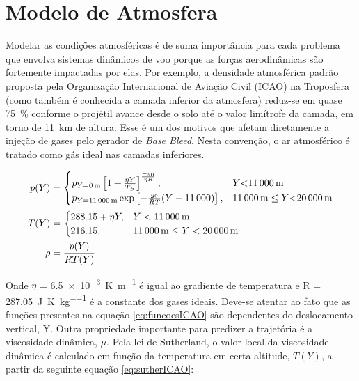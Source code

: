 \section{Modelo de Atmosfera}
\label{sec:ICAOatm}

Modelar as condições atmosféricas é de suma importância para cada problema que envolva sistemas dinâmicos de voo porque as forças aerodinâmicas são fortemente impactadas por elas. Por exemplo, a densidade atmosférica padrão proposta pela Organização Internacional de Aviação Civil (ICAO) \cite{international1993manual} na Troposfera (como também é conhecida a camada inferior da atmosfera) reduz-se em quase \qty{75}{\percent} conforme o projétil avance desde o solo até o valor limítrofe da camada, em torno de \qty{11}{\kilo\metre} de altura. Esse é um dos motivos que afetam diretamente a injeção de gases pelo gerador de \textit{Base Bleed}. Nesta convenção, o ar atmosférico é tratado como gás ideal nas camadas inferiores. 

\begin{equation}
\label{eq:funcoesICAO}
\begin{aligned}
p(Y) &=\begin{cases}
			p_{Y=\qty{0}{\metre}}\left[1 + \frac{\eta Y}{T_{B}} \right]^{\frac{-g_{0}}{\eta R}} , & Y \qty{< 11000}{\metre}\\
            p_{Y=\qty{11000}{\metre}} \exp\left[-\frac{g_{0}}{RT}(Y-\num{11000}) \right], & \qty{11000}{\metre} \leq Y \qty{< 20000}{\metre}
		 \end{cases}
\\
T(Y) &=\begin{cases}
			\num{288,15} + \eta Y, & Y < \qty{11000}{\metre}\\
            \num{216,15}, & \qty{11000}{\metre} \leq Y < \qty{20000}{\metre}
		 \end{cases}
\\
\rho &= \frac{p(Y)}{RT(Y)}
\end{aligned}
\end{equation}

Onde \(\eta\) = \qty{6,5e-3}{\kelvin\per\metre} é igual ao gradiente de temperatura e R = \qty{287,05}{\joule\per\kelvin\per\kilogram} é a constante dos gases ideais. Deve-se atentar ao fato que as funções presentes na equação \ref{eq:funcoesICAO} são dependentes do deslocamento vertical, Y. Outra propriedade importante para predizer a trajetória é a viscosidade dinâmica, \(\mu\). Pela lei de Sutherland, o valor local da viscosidade dinâmica é calculado em função da temperatura em certa altitude, \(T(Y)\), a partir da seguinte equação \ref{eq:sutherICAO}:

